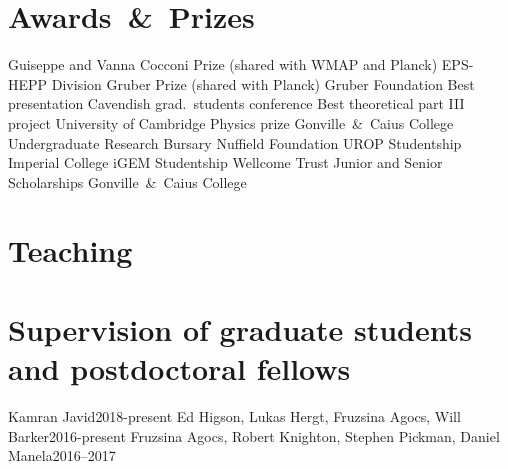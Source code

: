 \documentclass[11pt,a4paper,sans]{moderncv}
\begin{document}
\section{Awards~\&~Prizes}
  {Guiseppe and Vanna Cocconi Prize (shared with WMAP and Planck)}         {EPS-HEPP Division}
  {Gruber Prize (shared with Planck)}                 {Gruber Foundation}
  {Best presentation}                 {Cavendish grad.\ students conference}
  {Best theoretical part III project} {University of Cambridge} 
\cvitemwithcomment{}            {Physics prize}                     {Gonville~\&~Caius College} 
 {Undergraduate Research Bursary}    {Nuffield Foundation}  
\cvitemwithcomment{}            {UROP Studentship}                  {Imperial College} 
 {iGEM Studentship}                  {Wellcome Trust} 
    {Junior and Senior Scholarships}    {Gonville~\&~Caius College} 


\section{Teaching}

\section{Supervision of graduate students and postdoctoral fellows}
  {Kamran Javid}{2018-present}
  {Ed Higson, Lukas Hergt, Fruzsina Agocs, Will Barker}{2016-present}
\cvitemwithcomment{}  {Fruzsina Agocs, Robert Knighton, Stephen Pickman, Daniel Manela}{2016--2017}
\end{document}
